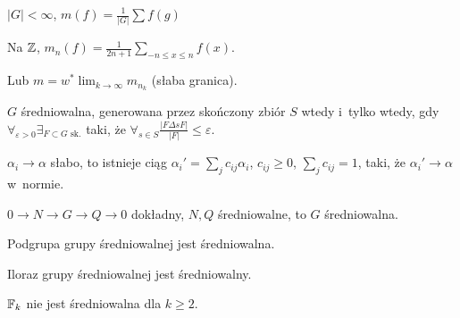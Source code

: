 \begin{przyklad}
	$|G|<\infty$, $m(f) = \frac{1}{|G|} \sum f(g)$
\end{przyklad}

\begin{przyklad}
	Na ${\mathbb{Z}}$, $m_n(f) = \frac{1}{2n+1} \sum_{-n \leq x \leq n} f(x)$.
	
	Lub $m = w^\ast\lim_{k \to \infty} m_{n_k}$ (słaba granica).
\end{przyklad}

\begin{twierdzenie}[F\o{}lner]
	$G$ średniowalna, generowana przez skończony zbiór $S$
	wtedy i~tylko wtedy, gdy
	$\forall_{\varepsilon > 0} \exists_{F \subset G\text{ sk.}}$
	taki, że $\forall_{s \in S} \frac{|F \Delta sF |}{|F|} \leq \varepsilon$.
\end{twierdzenie}

\begin{lemat}[Mazura]
	$\alpha_i \to \alpha$ słabo, to istnieje ciąg 
	$\alpha_i' = \sum_j c_{ij} \alpha_i$, $c_{ij} \geq 0$,
	$\sum_j c_{ij} = 1$, taki, że $\alpha_i' \to \alpha$ w~normie.
\end{lemat}

\begin{uwaga}
	$0 \to N \to G \to Q \to 0$ dokładny, $N, Q$ średniowalne, 
	to $G$ średniowalna.
	
	Podgrupa grupy średniowalnej jest średniowalna.
	
	Iloraz grupy średniowalnej jest średniowalny.
\end{uwaga}

\begin{przyklad}
	${\mathbb{F}}_k$ nie jest średniowalna dla $k \geq 2$.
\end{przyklad}


































